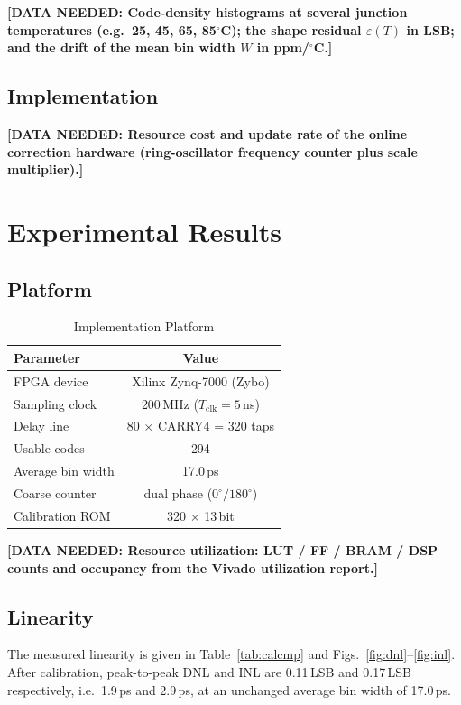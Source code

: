 \documentclass[journal]{IEEEtran}
\newcommand{\needdata}[1]{{\color{red}\textbf{[DATA NEEDED: #1]}}}
\begin{document}
\needdata{Code-density histograms at several junction temperatures
(e.g.\ 25, 45, 65, 85$^{\circ}$C); the shape residual $\varepsilon(T)$ in LSB;
and the drift of the mean bin width $\overline{W}$ in ppm/$^{\circ}$C.}

\subsection{Implementation}

\needdata{Resource cost and update rate of the online correction hardware
(ring-oscillator frequency counter plus scale multiplier).}

\section{Experimental Results}

\subsection{Platform}

\begin{table}[htbp]
\caption{Implementation Platform}
\centering
\begin{tabular}{lc}
\toprule
Parameter & Value \\
\midrule
FPGA device & Xilinx Zynq-7000 (Zybo) \\
Sampling clock & 200\,MHz ($T_{\mathrm{clk}}=5$\,ns) \\
Delay line & 80 $\times$ CARRY4 = 320 taps \\
Usable codes & 294 \\
Average bin width & 17.0\,ps \\
Coarse counter & dual phase ($0^{\circ}/180^{\circ}$) \\
Calibration ROM & 320 $\times$ 13\,bit \\
\bottomrule
\end{tabular}
\end{table}

\needdata{Resource utilization: LUT / FF / BRAM / DSP counts and occupancy
from the Vivado utilization report.}

\subsection{Linearity}

The measured linearity is given in Table~\ref{tab:calcmp} and
Figs.~\ref{fig:dnl}--\ref{fig:inl}. After calibration, peak-to-peak DNL and INL
are 0.11\,LSB and 0.17\,LSB respectively, i.e.\ 1.9\,ps and 2.9\,ps, at an
unchanged average bin width of 17.0\,ps.
\end{document}

